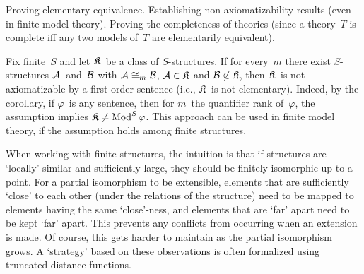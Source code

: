 \begin{app}
Proving elementary equivalence. Establishing non-axiomatizability results (even in finite model theory). Proving the completeness of theories (since a theory~\(T\) is complete iff any two models of~\(T\) are elementarily equivalent).
\end{app}
\begin{rmk}
Fix finite~\(S\) and let \(\mathfrak{K}\)~be a class of \(S\)-structures. If for every~\(m\) there exist \(S\)-structures \(\mathcal{A}\)~and~\(\mathcal{B}\) with \(\mathcal{A}\cong_m\mathcal{B}\), \(\mathcal{A}\in\mathfrak{K}\) and \(\mathcal{B}\not\in\mathfrak{K}\), then \(\mathfrak{K}\)~is not axiomatizable by a first-order sentence (i.e., \(\mathfrak{K}\)~is not elementary). Indeed, by the corollary, if \(\varphi\)~is any sentence, then for \(m\)~the quantifier rank of~\(\varphi\), the assumption implies \(\mathfrak{K}\ne\operatorname{Mod}^S\varphi\). This approach can be used in finite model theory, if the assumption holds among finite structures.

When working with finite structures, the intuition is that if structures are `locally' similar and sufficiently large, they should be finitely isomorphic up to a point. For a partial isomorphism to be extensible, elements that are sufficiently `close' to each other (under the relations of the structure) need to be mapped to elements having the same `close'-ness, and elements that are `far' apart need to be kept `far' apart. This prevents any conflicts from occurring when an extension is made. Of course, this gets harder to maintain as the partial isomorphism grows. A `strategy' based on these observations is often formalized using truncated distance functions.
\end{rmk}
